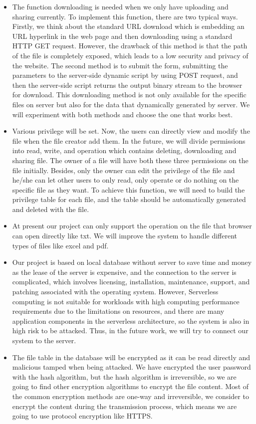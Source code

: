 \begin{itemize}
    \item The function downloading is needed when we only have uploading and sharing currently. To implement this function, there are two typical ways. Firstly, we think about the standard URL download which is embedding an URL hyperlink in the web page and then downloading using a standard HTTP GET request. However, the drawback of this method is that the path of the file is completely exposed, which leads to a low security and privacy of the website. The second method is to submit the form, submitting the parameters to the server-side dynamic script by using POST request, and then the server-side script returns the output binary stream to the browser for download. This downloading method is not only available for the specific files on server but also for the data that dynamically generated by server. We will experiment with both methods and choose the one that works best.
    \item Various privilege will be set. Now, the users can directly view and modify the file when the file creator add them. In the future, we will divide permissions into read, write, and operation which contains deleting, downloading and sharing file. The owner of a file will have both these three permissions on the file initially. Besides, only the owner can edit the privilege of the file and he/she can let other users to only read, only operate or do nothing on the specific file as they want. To achieve this function, we will need to build the privilege table for each file, and the table should be automatically generated and deleted with the file.
    \item At present our project can only support the operation on the file that browser can open directly like txt. We will improve the system to handle different types of files like excel and pdf. 
    \item Our project is based on local database without server to save time and money as the lease of the server is expensive, and the connection to the server is complicated, which involves licensing, installation, maintenance, support, and patching associated with the operating system. However, Serverless computing is not suitable for workloads with high computing performance requirements due to the limitations on resources, and there are many application components in the serverless architecture, so the system is also in high risk to be attacked. Thus, in the future work, we will try to connect our system to the server.
    \item The file table in the database will be encrypted as it can be read directly and malicious tamped when being attacked. We have encrypted the user password with the hash algorithm, but the hash algorithm is irreversible, so we are going to find other encryption algorithms to encrypt the file content. Most of the common encryption methods are one-way and irreversible, we consider to encrypt the content during the transmission process, which means we are going to use protocol encryption like HTTPS.

\end{itemize}





